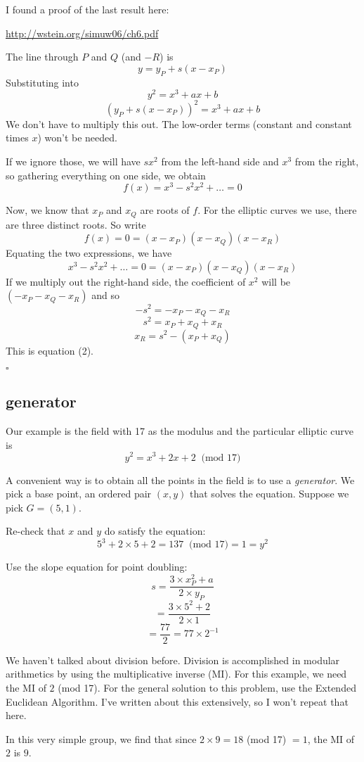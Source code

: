 \documentclass[11pt, oneside]{article}
\begin{document}
I found a proof of the last result here:

\url{http://wstein.org/simuw06/ch6.pdf}

The line through $P$ and $Q$ (and $-R$) is
\[ y = y_P + s(x - x_P) \]
Substituting into
\[ y^2 = x^3 + ax + b \]
\[ (y_P + s(x - x_P))^2 = x^3 + ax + b \]
We don't have to multiply this out.  The low-order terms (constant and constant times $x$) won't be needed.  

If we ignore those, we will have $sx^2$ from the left-hand side and $x^3$ from the right, so gathering everything on one side, we obtain 
\[ f(x) = x^3 - s^2 x^2 + \dots = 0 \]

Now, we know that $x_P$ and $x_Q$ are roots of $f$.  For the elliptic curves we use, there are three distinct roots.  So write
\[ f(x) = 0 = (x - x_P)(x - x_Q)(x - x_R) \]
Equating the two expressions, we have
 \[ x^3 - s^2 x^2 + \dots = 0 = (x - x_P)(x - x_Q)(x - x_R) \]
If we multiply out the right-hand side, the coefficient of $x^2$ will be $(-x_P - x_Q - x_R)$ and so
\[ -s^2 = -x_P - x_Q - x_R \]
\[ s^2 = x_P + x_Q + x_R \]
\[ x_R = s^2 - (x_P + x_Q) \]
This is equation (2).

$\square$

\subsection*{generator}
Our example is the field with 17 as the modulus and the particular elliptic curve is
\[ y^2 = x^3 + 2x + 2 \ \text{ (mod } 17) \]

A convenient way is to obtain all the points in the field is to use a \emph{generator}.  We pick a base point, an ordered pair $(x,y)$ that solves the equation.  Suppose we pick $G = (5,1)$.  

Re-check that $x$ and $y$ do satisfy the equation:
\[ 5^3 + 2 \times 5 + 2 = 137  \ \text{ (mod } 17) = 1 = y^2 \]

Use the slope equation for point doubling:
\[ s = \frac{3 \times x_P^2 + a}{2 \times y_P} \]
\[ = \frac{3 \times 5^2 + 2}{2 \times 1} \]
\[ = \frac{77}{2} = 77 \times 2^{-1}  \]

We haven't talked about division before.  Division is accomplished in modular arithmetics by using the multiplicative inverse (MI).  For this example, we need the MI of $2$ (mod 17).  For the general solution to this problem, use the Extended Euclidean Algorithm.  I've written about this extensively, so I won't repeat that here.

In this very simple group, we find that since $2 \times 9 = 18$ (mod 17) $ = 1$, the MI of $2$ is $9$.  
\end{document}
